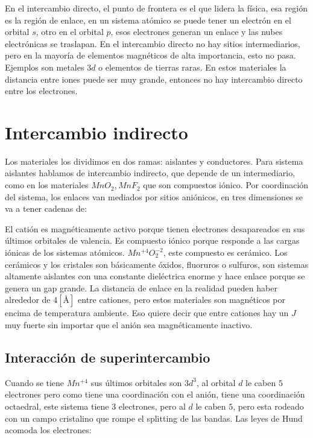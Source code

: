 \documentclass[11pt,fleqn]{book}
\begin{document}
En el intercambio directo, el punto de frontera es el que lidera la física, esa región es la región de enlace, en un sistema atómico se puede tener un  electrón en el orbital $s$, otro en el orbital $p$, esos electrones generan un enlace y las nubes electrónicas se traslapan. En el intercambio directo no hay sitios intermediarios, pero en la mayoría de elementos magnéticos de alta importancia, esto no pasa. Ejemplos son metales $3d$ o elementos de tierras raras. En estos materiales la distancia entre iones puede ser muy grande, entonces no hay intercambio directo entre los electrones.


\section{Intercambio indirecto}

Los materiales los dividimos en dos ramas: aislantes y conductores. Para sistema aislantes hablamos de intercambio indirecto, que depende de un intermediario, como en los materiales $MnO_{2}, MnF_{2}$ que son compuestos iónico. Por coordinación del sistema, los enlaces van mediados por sitios aniónicos, en tres dimensiones se va a tener cadenas de:



El catión es magnéticamente activo porque tienen electrones desapareados en sus últimos orbitales de valencia. Es compuesto iónico porque responde a las cargas iónicas de los sistemas atómicos. $Mn^{+4}O_{2}^{-2}$, este compuesto es cerámico. Los cerámicos y los cristales son básicamente óxidos, fluoruros o sulfuros, son sistemas altamente aislantes con una constante dieléctrica enorme y hace enlace porque se genera un gap grande. La distancia de enlace en la realidad pueden haber alrededor de $4 [\si{\angstrom}]$ entre cationes, pero estos materiales son magnéticos por encima de temperatura ambiente. Eso quiere decir que entre cationes hay un $J$ muy fuerte sin importar que el anión sea magnéticamente inactivo.


\subsection{Interacción de superintercambio}

Cuando se tiene $Mn^{+4}$ sus últimos orbitales son $3d^{3}$, al orbital $d$ le caben $5$ electrones pero como tiene una coordinación con el anión, tiene una coordinación octaedral, este sistema tiene 3 electrones, pero al $d$ le caben $5$, pero esta rodeado con un campo cristalino que rompe el splitting de las bandas. Las leyes de Hund acomoda los electrones:
\end{document}
